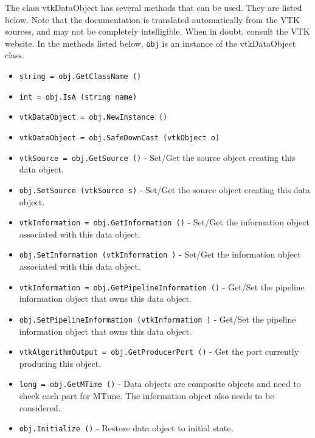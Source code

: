 The class vtkDataObject has several methods that can be used.
  They are listed below.
Note that the documentation is translated automatically from the VTK sources,
and may not be completely intelligible.  When in doubt, consult the VTK website.
In the methods listed below, \verb|obj| is an instance of the vtkDataObject class.
\begin{itemize}
\item  \verb|string = obj.GetClassName ()|

\item  \verb|int = obj.IsA (string name)|

\item  \verb|vtkDataObject = obj.NewInstance ()|

\item  \verb|vtkDataObject = obj.SafeDownCast (vtkObject o)|

\item  \verb|vtkSource = obj.GetSource ()| -  Set/Get the source object creating this data object.

\item  \verb|obj.SetSource (vtkSource s)| -  Set/Get the source object creating this data object.

\item  \verb|vtkInformation = obj.GetInformation ()| -  Set/Get the information object associated with this data object.

\item  \verb|obj.SetInformation (vtkInformation )| -  Set/Get the information object associated with this data object.

\item  \verb|vtkInformation = obj.GetPipelineInformation ()| -  Get/Set the pipeline information object that owns this data
 object.

\item  \verb|obj.SetPipelineInformation (vtkInformation )| -  Get/Set the pipeline information object that owns this data
 object.

\item  \verb|vtkAlgorithmOutput = obj.GetProducerPort ()| -  Get the port currently producing this object.

\item  \verb|long = obj.GetMTime ()| -  Data objects are composite objects and need to check each part for MTime.
 The information object also needs to be considered.

\item  \verb|obj.Initialize ()| -  Restore data object to initial state,


\end{itemize}
